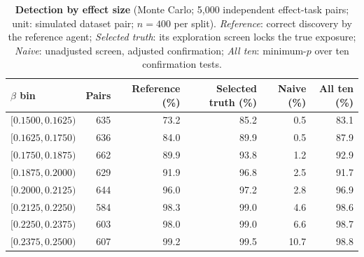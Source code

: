 \begin{table}[h]
\centering
\caption{\textbf{Detection by effect size} (Monte Carlo; 5,000 independent effect-task pairs; unit:
simulated dataset pair; $n=400$ per split). \emph{Reference}: correct discovery by the reference agent;
\emph{Selected truth}: its exploration screen locks the true exposure; \emph{Naive}: unadjusted screen,
adjusted confirmation; \emph{All ten}: minimum-$p$ over ten confirmation tests.}
\label{tab:power}
\small
\begin{tabular}{lrrrrr}
\toprule
$\beta$ bin & Pairs & Reference (\%) & Selected truth (\%) & Naive (\%) & All ten (\%)\\
\midrule
$[0.1500, 0.1625)$ & 635 & 73.2 & 85.2 & 0.5 & 83.1\\
$[0.1625, 0.1750)$ & 636 & 84.0 & 89.9 & 0.5 & 87.9\\
$[0.1750, 0.1875)$ & 662 & 89.9 & 93.8 & 1.2 & 92.9\\
$[0.1875, 0.2000)$ & 629 & 91.9 & 96.8 & 2.5 & 91.7\\
$[0.2000, 0.2125)$ & 644 & 96.0 & 97.2 & 2.8 & 96.9\\
$[0.2125, 0.2250)$ & 584 & 98.3 & 99.0 & 4.6 & 98.6\\
$[0.2250, 0.2375)$ & 603 & 98.0 & 99.0 & 6.6 & 98.7\\
$[0.2375, 0.2500)$ & 607 & 99.2 & 99.5 & 10.7 & 98.8\\
\bottomrule
\end{tabular}
\end{table}
